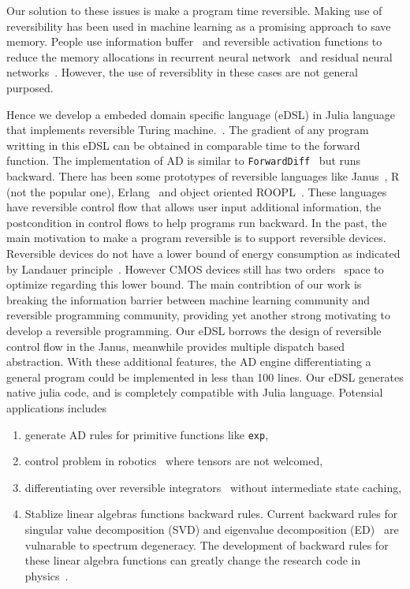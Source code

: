 \documentclass[aps,twocolumn,longbibliography,english,superscriptaddress,prr]{revtex4-1}
\newcommand{\<}{\langle}
\renewcommand{\>}{\rangle}
\theoremstyle{definition}\newtheorem{definition}{\textit{Definition}}
\begin{document}

Our solution to these issues is make a program time reversible. Making use of reversibility has been used in machine learning as a promising approach to save memory. People use information buffer~\cite{Maclaurin2015} and reversible activation functions to reduce the memory allocations in recurrent neural network~\cite{MacKay2018} and residual neural networks~\cite{Behrmann2018}. However, the use of reversiblity in these cases are not general purposed.

Hence we develop a embeded domain specific language (eDSL) in Julia language that implements reversible Turing machine.~\cite{Perumalla2013,Frank2017}.
The gradient of any program writting in this eDSL can be obtained in comparable time to the forward function. The implementation of AD is similar to \texttt{ForwardDiff}~\cite{Revels2016} but runs backward.
    There has been some prototypes of reversible languages like Janus~\cite{Lutz1986}, R (not the popular one), Erlang~\cite{Lanese2018} and object oriented ROOPL~\cite{}. These languages have reversible control flow that allows user input additional information, the postcondition in control flows to help programs run backward.
    In the past, the main motivation to make a program reversible is to support reversible devices. Reversible devices do not have a lower bound of energy consumption as indicated by Landauer principle~\cite{Landauer1961}. However CMOS devices still has two orders~\cite{Frank2017} space to optimize regarding this lower bound.
    The main contribtion of our work is breaking the information barrier between machine learning community and reversible programming community, providing yet another strong motivating to develop a reversible programming.
    Our eDSL borrows the design of reversible control flow in the Janus, meanwhile provides multiple dispatch based abstraction. With these additional features, the AD engine differentiating a general program could be implemented in less than 100 lines.
Our eDSL generates native julia code, and is completely compatible with Julia language.
Potensial applications includes
\begin{enumerate}
    \item generate AD rules for primitive functions like \texttt{exp},
    \item control problem in robotics~\cite{Giftthaler2017} where tensors are not welcomed,
    \item differentiating over reversible integrators~\cite{Laikov2018} without intermediate state caching,
    \item Stablize linear algebras functions backward rules. Current backward rules for singular value decomposition (SVD) and eigenvalue decomposition (ED)~\cite{Seeger2017,Wan2019,Hubig2019} are vulnarable to spectrum degeneracy. The development of backward rules for these linear algebra functions can greatly change the research code in physics~\cite{Xie2020,Liao2019}.

\end{enumerate}
\end{document}
